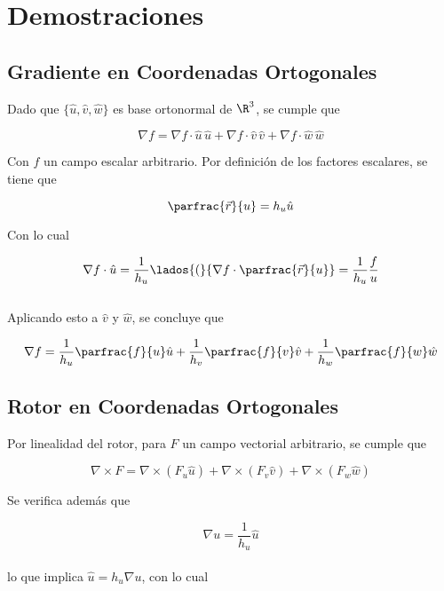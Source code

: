 \section{Demostraciones}

\subsection{Gradiente en Coordenadas Ortogonales}

\label{Dem:Gradiente}

Dado que $\{\hat{u},\hat{v},\hat{w}\}$ es base ortonormal de $\R^3$, se cumple que

\[\nabla f = \nabla f\cdot\hat{u}\,\hat{u}+
\nabla f\cdot\hat{v}\,\hat{v}+\nabla f\cdot\hat{w}\,\hat{w}\]

Con $f$ un campo escalar arbitrario. Por definición de los factores escalares, se tiene que

\[\parfrac{\Vec{r}}{u}=h_u\hat{u}\]

Con lo cual

\[\nabla f\cdot\hat{u}=\frac{1}{h_u}
\lados{(}{\nabla f\cdot\parfrac{\Vec{r}}{u}}=\frac{1}{h_u}
\frac{f}{u}\]
\\
Aplicando esto a $\hat{v}$ y $\hat{w}$, se concluye que

\[\nabla f = \frac{1}{h_u}\parfrac{f}{u}\hat{u}+
\frac{1}{h_v}\parfrac{f}{v}\hat{v}+\frac{1}{h_w}\parfrac{f}{w}\hat{w}\]


\subsection{Rotor en Coordenadas Ortogonales}
\label{Dem:Rotor}
Por linealidad del rotor, para $F$ un campo vectorial arbitrario, se cumple que

\[\nabla\times F=\nabla\times(F_u\hat{u})+
\nabla\times(F_v\hat{v})+\nabla\times(F_w\hat{w})\]


Se verifica además que 

\[\nabla u = \frac{1}{h_u}\hat{u}\]
\\

lo que implica $\hat{u}=h_u\nabla u$, con lo cual

